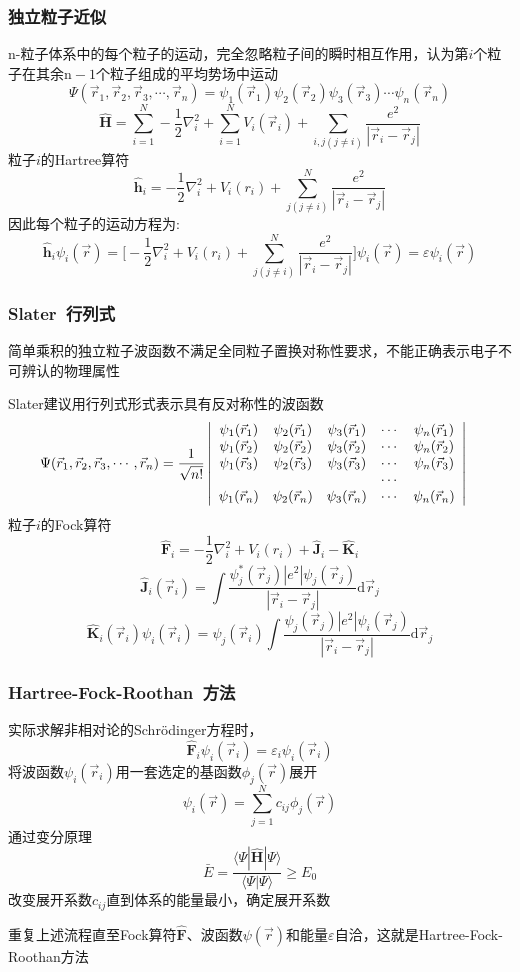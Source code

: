 \documentclass[cjk,slidestop,compress,mathserif,blue]{beamer}
\begin{document}
\frame
{
	\frametitle{独立粒子近似}
	\textrm{n-}粒子体系中的每个粒子的运动，完全忽略粒子间的瞬时相互作用，认为第$i$个粒子在其余$\mathrm{n}-1$个粒子组成的平均势场中运动
	$$\Psi(\vec r_1,\vec r_2,\vec r_3,\cdots,\vec r_n)=\psi_1(\vec r_1)\psi_2(\vec r_2)\psi_3(\vec r_3)\cdots\psi_n(\vec r_n)$$
	$$\hat{\mathbf H}=\sum_{i=1}^N-\dfrac{1}{2}\nabla_i^2+\sum_{i=1}^NV_i(\vec r_i)+\sum_{i,j(j\neq i)}\dfrac{e^2}{|\vec r_i-\vec r_j|}$$
	粒子$i$的\textrm{Hartree}算符
	$$\hat{\mathbf h}_i=-\dfrac{1}{2}\nabla_i^2+V_i(r_i)+\sum_{j(j\neq i)}^N\dfrac{e^2}{|\vec r_i-\vec r_j|}$$
	因此每个粒子的运动方程为:
	$$\hat{\mathbf h}_i\psi_i(\vec r)=\bigg[-\dfrac{1}{2}\nabla_i^2+V_i(r_i)+\sum_{j(j\neq i)}^N\dfrac{e^2}{|\vec r_i-\vec r_j|}\bigg]\psi_i(\vec r)=\varepsilon\psi_i(\vec r)$$ 
}

\frame
{
	\frametitle{\textrm{Slater~}行列式}
	简单乘积的独立粒子波函数不满足全同粒子置换对称性要求，不能正确表示电子不可辨认的物理属性
	
	\textrm{Slater}建议用行列式形式表示具有反对称性的波函数
	\begin{displaymath}
		\hspace*{-10pt}\Psi(\vec r_1,\vec r_2,\vec r_3,\cdots,\vec r_n)=\dfrac1{\sqrt{n!}}
		\left|\begin{array}{ccccc}
			\psi_1(\vec r_1)&\psi_2(\vec r_1)&\psi_3(\vec r_1)&\cdots&\psi_n(\vec r_1)\\
			\psi_1(\vec r_2)&\psi_2(\vec r_2)&\psi_3(\vec r_2)&\cdots&\psi_n(\vec r_2)\\
			\psi_1(\vec r_3)&\psi_2(\vec r_3)&\psi_3(\vec r_3)&\cdots&\psi_n(\vec r_3)\\
			&&&\cdots&\\
			\psi_1(\vec r_n)&\psi_2(\vec r_n)&\psi_3(\vec r_n)&\cdots&\psi_n(\vec r_n)
		\end{array}\right|
	\end{displaymath}
	粒子$i$的\textrm{Fock}算符
	$$\hat{\mathbf F}_i=-\dfrac{1}{2}\nabla_i^2+V_i(r_i)+\hat{\mathbf J}_i-\hat{\mathbf K}_i$$
	$$\hat{\mathbf J}_i(\vec r_i)=\int\dfrac{\psi_j^{\ast}(\vec r_j)|e^2|\psi_j(\vec r_j)}{|\vec r_i-\vec r_j|}\mathrm{d}\vec r_j$$
	$$\hat{\mathbf K}_i(\vec r_i)\psi_i(\vec r_i)=\psi_j(\vec r_i)\int\dfrac{\psi_j(\vec r_j)|e^2|\psi_i(\vec r_j)}{|\vec r_i-\vec r_j|}\mathrm{d}\vec r_j$$

}

\frame
{
	\frametitle{\textrm{Hartree-Fock-Roothan~}方法}
	实际求解非相对论的\textrm{Schr\"odinger}方程时，
	$$\hat{\mathbf F}_i\psi_i(\vec r_i)=\varepsilon_i\psi_i(\vec r_i)$$
	将波函数$\psi_i(\vec r_i)$用一套选定的基函数$\phi_j(\vec r)$展开
	$$\psi_i(\vec r)=\sum_{j=1}^Nc_{ij}\phi_j(\vec r)$$
	通过变分原理
	$$\bar E=\dfrac{\langle\Psi|\hat{\mathbf H}|\Psi\rangle}{\langle\Psi|\Psi\rangle}\geqslant E_0$$
	改变展开系数$c_{ij}$直到体系的能量最小，确定展开系数

	重复上述流程直至\textrm{Fock}算符$\hat{\mathbf F}$、波函数$\psi(\vec r)$和能量$\varepsilon$自洽，这就是\textrm{Hartree-Fock-Roothan}方法
}
\end{document}
